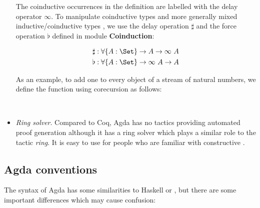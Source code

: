 \begin{itemize}
The coinductive occurrences in the definition are labelled with the delay operator $\infty$. To manipulate coinductive types and more generally mixed inductive/coinductive types \cite{txa:mpc2010g}, we use the delay operation $\sharp$ and the force operation $\flat$ defined in module \textbf{Coinduction}:

\begin{align*}
\sharp &: \forall \{A : \Set\} \to A \to \infty~ A \\
\flat  &: \forall \{A : \Set\} \to \infty ~A \to A
\end{align*}


As an example, to add one to every object of a stream of natural numbers, we define the function using corecursion as follows:

\begin{code}
\> \AgdaSymbol{:}     \<%
\\
\> \AgdaSymbol{(} \AgdaInductiveConstructor{::} \AgdaSymbol{)} \AgdaSymbol{=}   \AgdaInductiveConstructor{::}   \AgdaSymbol{(} \AgdaSymbol{)}\<%
\end{code}

\item \textit{Ring solver}. Compared to Coq, Agda has no tactics providing automated proof generation although it has a ring solver which plays a similar role to the tactic \textit{ring}. It is easy to use for people who are familiar with constructive \maths.
\end{itemize} 


\subsection{Agda conventions}\label{agdaconventions}

The syntax of Agda has some similarities to Haskell or \mltt, but there are some important differences which may cause confusion:

